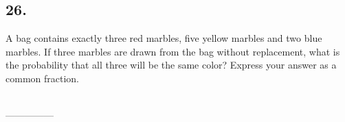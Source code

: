 \documentclass[12pt]{article}
\newenvironment{answer}{\vspace{1em}}{}
\newenvironment{answer}{\vspace{0em}\expandafter\comment}{\expandafter\endcomment}
\newlength{\currentparskip}
\newlength{\currentparindent}
\newenvironment{minipagex}[2][]
  {\setlength{\currentparskip}{\parskip}%
    \setlength{\currentparindent}{\parindent}%
   \begin{minipage}[#1]{#2}%
   \setlength{\parskip}{\currentparskip}%
   \setlength{\parindent}{\currentparindent}%
  }
  {\end{minipage}}
\begin{document}
\begin{answer}
%
\end{answer}


\subsection*{26.}
A bag contains exactly three red marbles, five yellow marbles and two blue marbles. If three marbles are drawn from the bag without replacement, what is the probability that all three will be the same color? Express your answer as a common fraction.

\fbox{\phantom{ANSWER}}\\
\mbox{---------------}\\
\fbox{\phantom{ANSWER}}
\end{document}
